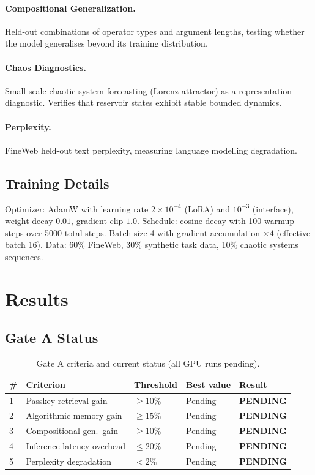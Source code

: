 \documentclass[11pt,a4paper]{article}
\theoremstyle{definition}
\begin{document}
\paragraph{Compositional Generalization.}
Held-out combinations of operator types and argument lengths, testing
whether the model generalises beyond its training distribution.

\paragraph{Chaos Diagnostics.}
Small-scale chaotic system forecasting (Lorenz attractor) as a representation
diagnostic.  Verifies that reservoir states exhibit stable bounded dynamics.

\paragraph{Perplexity.}
FineWeb held-out text perplexity, measuring language modelling degradation.

\subsection{Training Details}

Optimizer: AdamW with learning rate $2 \times 10^{-4}$ (LoRA) and $10^{-3}$
(interface), weight decay $0.01$, gradient clip $1.0$.  Schedule: cosine
decay with 100 warmup steps over 5000 total steps.  Batch size 4 with
gradient accumulation $\times 4$ (effective batch 16).  Data: 60\% FineWeb,
30\% synthetic task data, 10\% chaotic systems sequences.

\section{Results}
\label{sec:results}

\subsection{Gate A Status}

\begin{table}[h]
\centering
\caption{Gate A criteria and current status (all GPU runs pending).}
\label{tab:gate_a}
\begin{tabular}{@{}lllll@{}}
\toprule
\# & Criterion & Threshold & Best value & Result \\
\midrule
1 & Passkey retrieval gain & $\geq 10\%$ & Pending & \textbf{PENDING} \\
2 & Algorithmic memory gain & $\geq 15\%$ & Pending & \textbf{PENDING} \\
3 & Compositional gen.\ gain & $\geq 10\%$ & Pending & \textbf{PENDING} \\
4 & Inference latency overhead & $\leq 20\%$ & Pending & \textbf{PENDING} \\
5 & Perplexity degradation & $< 2\%$ & Pending & \textbf{PENDING} \\
\bottomrule
\end{tabular}
\end{table}
\end{document}
